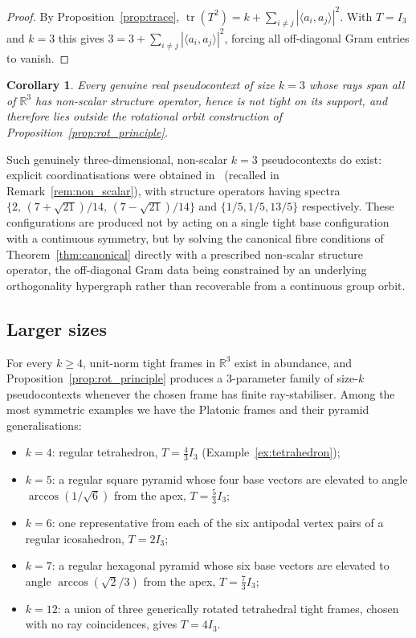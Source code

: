 \documentclass[
  twocolumn,
  aps,
  pra,
  floatfix,
  amsmath,amssymb,
  longbibliography
]{revtex4-2}
\newtheorem{corollary}[theorem]{Corollary}
\theoremstyle{definition}
\theoremstyle{remark}
\begin{document}
\begin{proof}
By Proposition~\ref{prop:trace},
$\operatorname{tr}(T^2)=k+\sum_{i\neq j}|\langle a_i,a_j\rangle|^2$.
With $T=I_3$ and $k=3$ this gives $3=3+\sum_{i\neq j}|\langle
a_i,a_j\rangle|^2$, forcing all off-diagonal Gram entries to vanish.
\end{proof}

\begin{corollary}\label{cor:k3_nondegenerate}
Every genuine real pseudocontext of size $k=3$ whose rays span all
of $\mathbb{R}^3$ has non-scalar structure operator, hence is not tight on its support, and
therefore lies outside the rotational orbit construction of
Proposition~\ref{prop:rot_principle}.
\end{corollary}

Such genuinely three-dimensional, non-scalar $k=3$
pseudocontexts do exist: explicit coordinatisations were obtained
in~\cite{2023-navara-svozil} (recalled in
Remark~\ref{rem:non_scalar}), with structure operators having
spectra
\(\{2,\,(7+\sqrt{21})/14,\,(7-\sqrt{21})/14\}\) and
$\{1/5,1/5,13/5\}$ respectively.  These configurations are produced
not by acting on a single tight base configuration with a continuous
symmetry, but by solving the canonical fibre conditions of
Theorem~\ref{thm:canonical} directly with a prescribed non-scalar structure operator, the off-diagonal Gram data being constrained by an
underlying orthogonality hypergraph rather than recoverable from a
continuous group orbit.

\subsection{Larger sizes}

For every $k\ge 4$, unit-norm tight frames in $\mathbb{R}^3$ exist
in abundance, and Proposition~\ref{prop:rot_principle} produces a
$3$-parameter family of size-$k$ pseudocontexts whenever the chosen
frame has finite ray-stabiliser. Among the most symmetric examples we have the Platonic frames and their pyramid generalisations:
\begin{itemize}
  \item $k=4$: regular tetrahedron, $T=\tfrac{4}{3}I_3$
        (Example~\ref{ex:tetrahedron});
  \item $k=5$: a regular square pyramid whose four base vectors are elevated to angle $\arccos(1/\sqrt{6})$ from the apex, $T=\tfrac{5}{3}I_3$;
  \item $k=6$: one representative from each of the six antipodal
        vertex pairs of a regular icosahedron, $T=2I_3$;
  \item $k=7$: a regular hexagonal pyramid whose six base vectors are elevated to angle $\arccos(\sqrt{2}/3)$ from the apex, $T=\tfrac{7}{3}I_3$;
  \item \(k=12\): a union of three generically rotated tetrahedral tight
frames, chosen with no ray coincidences, gives \(T=4I_3\).
\end{itemize}
\end{document}
